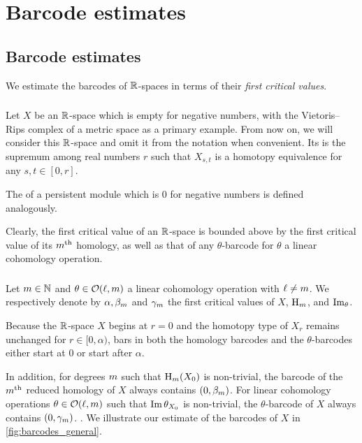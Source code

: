 
\section{Barcode estimates}\label{s:computations}

\subsection{Barcode estimates}\label{sub:general_barcodes}

We estimate the barcodes of $\mathbb{R}$-spaces in terms of their \textit{first critical values}.

\subsubsection{}\label{subsub:first_critical_value}

Let $X$ be an $\mathbb{R}$-space which is empty for negative numbers, with the Vietoris--Rips complex of a metric space as a primary example.
From now on, we will consider this $\mathbb{R}$-space and omit it from the notation when convenient.
Its  is the supremum among real numbers $r$ such that $X_{s,t}$ is a homotopy equivalence for any $s,t \in [0,r]$.

The  of a persistent module which is \(0\) for negative numbers is defined analogously.

\medskip\remark
Clearly, the first critical value of an $\mathbb{R}$-space is bounded above by the first critical value of its $m^{\mathrm{th}}$ homology, as well as that of any $\theta$-barcode for $\theta$ a linear cohomology operation.

\subsubsection{}\label{subsub:barcode_general}

Let \(m \in \mathbb{N}\) and \(\theta \in \mathcal{O}(\ell,m)\) a linear cohomology operation with \(\ell \neq m\).
We respectively denote by $\alpha, \beta_m$ and $\gamma_m$ the first critical values of $X$, \(\mathrm{H}_m\), and \(\operatorname{Im}_\theta\).

Because the $\mathbb{R}$-space $X$ begins at $r=0$ and the homotopy type of $X_r$ remains unchanged for $r\in [0,\alpha)$, bars in both the homology barcodes and the $\theta$-barcodes either start at $0$ or start after $\alpha$.

In addition, for degrees $m$ such that $\mathrm{H}_m(X_0)$ is non-trivial, the barcode of the $m^{\mathrm{th}}$ reduced homology of $X$ always contains $(0,\beta_m )$.
For linear cohomology operations $\theta \in \mathcal{O}(\ell, m)$ such that $\operatorname{Im} \theta_{X_0}$ is non-trivial, the $\theta$-barcode of $X$ always contains $(0,\gamma_m)$.
.
We illustrate our estimate of the barcodes of $X$ in \cref{fig:barcodes_general}.

